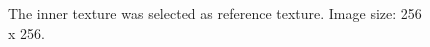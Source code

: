 \begin{figure}
\begin{minipage}[t]{0.32\linewidth}
	\end{minipage}
	\begin{minipage}[t]{0.32\linewidth}
		\centering
	\end{minipage}
	\caption{The inner texture was selected as reference texture. Image size: 256 x 256.}
	\label{fig:TestImage2}
\end{figure}


